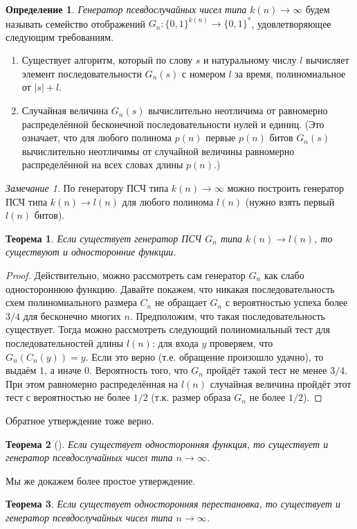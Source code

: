 \documentclass[12pt,a4paper]{article}
\newcommand{\bits}{\{0,1\}}
\newcommand{\bitstr}{\bits^*}
\theoremstyle{definition}
\newtheorem{definition}{Определение}[section]
\theoremstyle{plain}
\newtheorem{theorem}{Теорема}[section]
\theoremstyle{remark}
\newtheorem{remark}{Замечание}[section]
\begin{document}
\begin{definition}
\emph{Генератор псевдослучайных чисел типа $k(n)\to\infty$} будем
называть семейство отображений $G_n: \bits^{k(n)}\to\bitstr$,
удовлетворяющее следующим требованиям.
\begin{enumerate}
\item Существует алгоритм, который по слову $s$ и натуральному числу $l$
вычисляет элемент последовательности $G_n(s)$ с номером $l$ за время, полиномиальное
от $|s| + l$.

\item Случайная величина $G_n(s)$ вычислительно неотличима от равномерно
распределённой бесконечной последовательности нулей и единиц.
(Это означает, что для любого полинома $p(n)$ первые $p(n)$ битов
$G_n(s)$ вычислительно неотличимы от случайной величины равномерно
распределённой на всех словах длины $p(n)$.)
\end{enumerate}
\end{definition}
 
\begin{remark}
По генератору ПСЧ типа $k(n)\to\infty$ можно построить генератор ПСЧ
типа $k(n)\to l(n)$ для любого полинома $l(n)$ (нужно взять первый $l(n)$ битов).
\end{remark}

\begin{theorem}
Если существует генератор ПСЧ $G_n$ типа $k(n)\to l(n)$,
то существуют и односторонние функции.
\end{theorem}
\begin{proof}
Действительно, можно рассмотреть сам генератор $G_n$ как слабо одностороннюю функцию.
Давайте покажем, что никакая последовательность схем полиномиального размера 
$C_n$ не обращает $G_n$ с вероятностью успеха более $3/4$ для бесконечно многих $n$.
Предположим, что такая последовательность существует. Тогда можно рассмотреть
следующий полиномиальный тест для последовательностей длины $l(n)$: для входа $y$ проверяем, что $G_n(C_n(y)) = y$. Если это верно (т.е. обращение произошло удачно), 
то выдаём $1$, а иначе $0$. Вероятность того, что $G_n$ пройдёт такой тест 
не менее $3/4$. При этом равномерно распределённая на $l(n)$ случайная 
величина пройдёт этот тест с вероятностью не более $1/2$ (т.к. размер 
образа $G_n$ не более $1/2$). 
\end{proof}
Обратное утверждение тоже верно. 
\begin{theorem}[\cite{hill}]
Если существует односторонняя функция, то существует
и генератор псевдослучайных чисел типа $n\to\infty$.
\end{theorem}
Мы же докажем более простое утверждение.
\begin{theorem}
Если существует односторонняя перестановка, то существует
и генератор псевдослучайных чисел типа $n\to\infty$.
\end{theorem}
\end{document}
